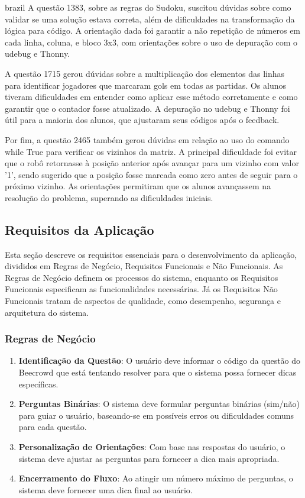 \begin{otherlanguage*}{brazil}
A questão 1383, sobre as regras do Sudoku, suscitou dúvidas sobre como validar se uma solução estava correta, além de dificuldades na transformação da lógica para código. A orientação dada foi garantir a não repetição de números em cada linha, coluna, e bloco 3x3, com orientações sobre o uso de depuração com o udebug e Thonny.

A questão 1715 gerou dúvidas sobre a multiplicação dos elementos das linhas para identificar jogadores que marcaram gols em todas as partidas. Os alunos tiveram dificuldades em entender como aplicar esse método corretamente e como garantir que o contador fosse atualizado. A depuração no udebug e Thonny foi útil para a maioria dos alunos, que ajustaram seus códigos após o feedback.

Por fim, a questão 2465 também gerou dúvidas em relação ao uso do comando while True para verificar os vizinhos da matriz. A principal dificuldade foi evitar que o robô retornasse à posição anterior após avançar para um vizinho com valor '1', sendo sugerido que a posição fosse marcada como zero antes de seguir para o próximo vizinho. As orientações permitiram que os alunos avançassem na resolução do problema, superando as dificuldades iniciais.

\subsection{Requisitos da Aplicação}
\label{sec:requisitos-aplicacao}

Esta seção descreve os requisitos essenciais para o desenvolvimento da aplicação, divididos em Regras de Negócio, Requisitos Funcionais e Não Funcionais. As Regras de Negócio definem os processos do sistema, enquanto os Requisitos Funcionais especificam as funcionalidades necessárias. Já os Requisitos Não Funcionais tratam de aspectos de qualidade, como desempenho, segurança e arquitetura do sistema.

\subsubsection{Regras de Negócio}

\begin{enumerate}[label=RN\arabic* –]
    \item \textbf{Identificação da Questão}: O usuário deve informar o código da questão do Beecrowd que está tentando resolver para que o sistema possa fornecer dicas específicas.
    \item \textbf{Perguntas Binárias}: O sistema deve formular perguntas binárias (sim/não) para guiar o usuário, baseando-se em possíveis erros ou dificuldades comuns para cada questão.
    \item \textbf{Personalização de Orientações}: Com base nas respostas do usuário, o sistema deve ajustar as perguntas para fornecer a dica mais apropriada.
    \item \textbf{Encerramento do Fluxo}: Ao atingir um número máximo de perguntas, o sistema deve fornecer uma dica final ao usuário.
\end{enumerate}


\end{otherlanguage*}
